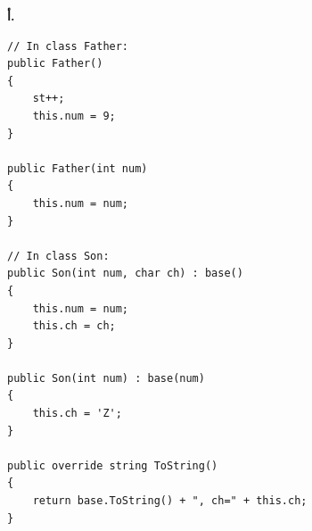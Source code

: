 \def\bagrutTocEntry{\phantomsection\addcontentsline{toc}{subsection}{\texorpdfstring{سؤال $11$ امتحان $\mathrm{899271}$ سنة $2026$}{سؤال 11 امتحان 899271 سنة 2026}}\global\let\bagrutTocEntry\relax}%



\ifwithsols
\begin{boxSolution}
\textbf{أ.}
\begin{boxCode}
\begin{english}
\begin{verbatim}
// In class Father:
public Father()
{
    st++;
    this.num = 9;
}

public Father(int num)
{
    this.num = num;
}

// In class Son:
public Son(int num, char ch) : base()
{
    this.num = num;
    this.ch = ch;
}

public Son(int num) : base(num)
{
    this.ch = 'Z';
}

public override string ToString()
{
    return base.ToString() + ", ch=" + this.ch;
}
\end{verbatim}
\end{english}
\end{boxCode}
\end{boxSolution}

\filbreak

